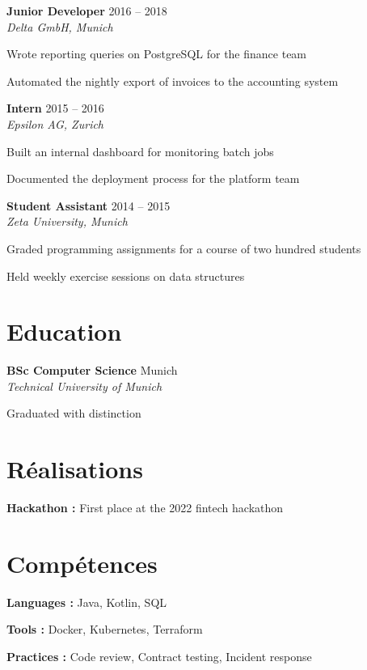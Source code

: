 \documentclass[10pt]{extarticle}
\newcommand{\role}[3]{%
  \textbf{#1} \hfill {\color{soft}\small #3}\\[-1pt]
  {\itshape\small #2}\par
}
\newcommand{\edu}[3]{%
  \textbf{#1} \hfill {\color{soft}\small #3}\\[-1pt]
  {\itshape\small #2}\par
}
\begin{document}
\role{Junior Developer}{Delta GmbH, Munich}{2016 – 2018}

\begin{tightlist}
    \item Wrote reporting queries on PostgreSQL for the finance team

    \item Automated the nightly export of invoices to the accounting system

\end{tightlist}

\role{Intern}{Epsilon AG, Zurich}{2015 – 2016}

\begin{tightlist}
    \item Built an internal dashboard for monitoring batch jobs

    \item Documented the deployment process for the platform team

\end{tightlist}

\role{Student Assistant}{Zeta University, Munich}{2014 – 2015}

\begin{tightlist}
    \item Graded programming assignments for a course of two hundred students

    \item Held weekly exercise sessions on data structures

\end{tightlist}

\section{Education}

\edu{BSc Computer Science}{Technical University of Munich}{Munich}

{\footnotesize Graduated with distinction}

\section{Réalisations}

\begin{tightlist}
\item \textbf{Hackathon :} First place at the 2022 fintech hackathon
\end{tightlist}

\section{Compétences}

\begin{tightlist}
    \item[] \textbf{Languages :} Java, Kotlin, SQL

    \item[] \textbf{Tools :} Docker, Kubernetes, Terraform

    \item[] \textbf{Practices :} Code review, Contract testing, Incident response

\end{tightlist}
\end{document}
